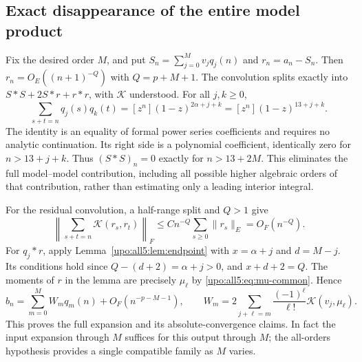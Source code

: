 \documentclass[11pt,letterpaper]{article}
\theoremstyle{remark}\newtheorem{remark}[theorem]{Remark}
\numberwithin{equation}{section}
\begin{document}
\subsection{Exact disappearance of the entire model product}
Fix the desired order $M$, and put
$S_n=\sum_{j=0}^Mv_jq_j(n)$ and $r_n=a_n-S_n$.
Then $r_n=O_E((n+1)^{-Q})$ with $Q=p+M+1$.
The convolution splits exactly into $S*S+2S*r+r*r$, with
$\mathcal K$ understood. For all $j,k\ge0$,
\begin{equation}\label{upo:all5:eq:polynomial-cancel}
 \sum_{s+t=n}q_j(s)q_k(t)
    =[z^n](1-z)^{2\alpha+j+k}
    =[z^n](1-z)^{13+j+k}.
\end{equation}
The identity is an equality of formal power series coefficients and
requires no analytic continuation. Its right side is a polynomial
coefficient, identically zero for $n>13+j+k$.
Thus $(S*S)_n=0$ exactly for $n>13+2M$.
This eliminates the full model--model contribution, including all
possible higher algebraic orders of that contribution, rather than
estimating only a leading interior integral.

For the residual convolution, a half-range split and $Q>1$ give
\begin{equation}\label{upo:all5:eq:rr}
 \left\|\sum_{s+t=n}\mathcal K(r_s,r_t)\right\|_F
                  \le Cn^{-Q}\sum_{s\ge0}\|r_s\|_E
                  =O_F(n^{-Q}).
\end{equation}
For $q_j*r$, apply Lemma~\ref{upo:all5:lem:endpoint} with
$x=\alpha+j$ and $d=M-j$. Its conditions hold since
$Q-(d+2)=\alpha+j>0$, and $x+d+2=Q$.
The moments of $r$ in the lemma are precisely $\mu_\ell$ by
\eqref{upo:all5:eq:mu-common}. Hence
\begin{equation}\label{upo:all5:eq:binomial-result}
 b_n=\sum_{m=0}^MW_mq_m(n)+O_F(n^{-p-M-1}),\qquad
 W_m=2\sum_{j+\ell=m}\frac{(-1)^\ell}{\ell!}
                                  \mathcal K(v_j,\mu_\ell).
\end{equation}
This proves the full expansion and its absolute-convergence claims.
In fact the input expansion through $M$ suffices for this output
through $M$; the all-orders hypothesis provides a single compatible
family as $M$ varies.
\end{document}
